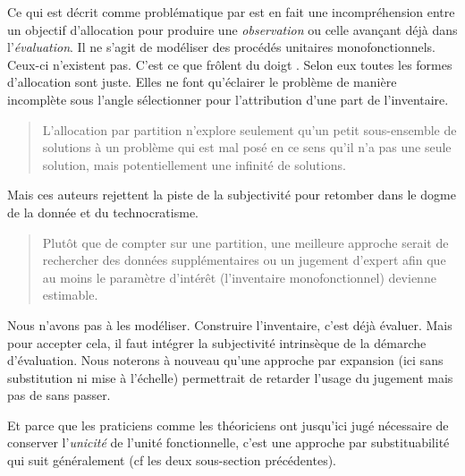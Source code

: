 Ce qui est décrit comme problématique par \citeauthor{weidema_avoiding_2010} est en fait une incompréhension entre un objectif d'allocation pour produire une \emph{observation} ou celle avançant déjà dans l'\emph{évaluation}.
Il ne s'agit de modéliser des procédés unitaires monofonctionnels.
Ceux-ci n'existent pas.
C'est ce que frôlent du doigt \citeauthor{cruze_allocation_2014}.
Selon eux toutes les formes d'allocation sont juste.
Elles ne font qu'éclairer le problème de manière incomplète sous l'angle sélectionner pour l'attribution d'une part de l'inventaire.
\blockcquote[traduction]{cruze_allocation_2014}{
L'allocation par partition n'explore seulement qu'un petit sous-ensemble de solutions à un problème qui est mal posé en ce sens qu'il n'a pas une seule solution, mais potentiellement une infinité de solutions.
}
Mais ces auteurs rejettent la piste de la subjectivité pour retomber dans le dogme de la donnée et du technocratisme.
\blockcquote[traduction de la conclusion]{cruze_allocation_2014}{
Plutôt que de compter sur une partition, une meilleure approche serait de rechercher des données supplémentaires ou un jugement d'expert afin que au moins le paramètre d'intérêt (l'inventaire monofonctionnel) devienne estimable.
}

Nous n'avons pas à les modéliser.
Construire l'inventaire, c'est déjà évaluer.
Mais pour accepter cela, il faut intégrer la subjectivité intrinsèque de la démarche d'évaluation.
Nous noterons à nouveau qu'une approche par expansion (ici sans substitution ni mise à l'échelle) permettrait de retarder l'usage du jugement mais pas de sans passer.


Et parce que les praticiens comme les théoriciens ont jusqu'ici jugé nécessaire de conserver l'\emph{unicité} de l'unité fonctionnelle, c'est une approche par substituabilité qui suit généralement (cf les deux sous-section précédentes).


